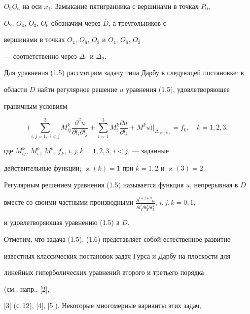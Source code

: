 $O_5O_6$ на оси $x_1$. Замыкание пятигранника с вершинами в точках $P_0$,


$O_2$, $O_4$, $O_3$, $O_6$ обозначим через $\overline D$, а треугольников с


вершинами в точках $O_4$, $O_6$, $O_2$ и $O_4$, $O_6$, $O_3$


--- соответственно через $\Delta_1 $ и $\Delta_2$.





Для уравнения (1.5) рассмотрим задачу типа Дарбу в следующей постановке: в


области $D$ найти регулярное решение $u$ уравнения (1.5), удовлетворяющее


граничным условиям




\begin{equation}


\bigg (\sum_{i,j=1,\;i<j}^3 M_{ij}^k \frac{\partial^{2}u}{\partial l_i


\partial l_j}+\sum_{i=1}^{3}M_i^k \frac{\partial u}{\partial l_i}+M^k u


\bigg ){\Big |}_{\Delta_{\varkappa(k)}}=f_k,\quad k=1,2,3,


\end{equation}


где $M_{ij}^k$, $M_i^k$, $M^k$, $f_k$, $i,j,k=1,2,3$, $i<j$, --- заданные


действительные функции; $\varkappa(k)=1$ при $k=1,2$ и $\varkappa(3)=2$.





Регулярным решением уравнения (1.5) называется функция $u$, непрерывная в $D$


вместе со своими частными производными $\frac{\partial^{i+j+k}u}{\partial


l_1^i \partial l_2^j \partial l_3^k}$, $i,j,k=0,1$,


и удовлетворяющая уравнению (1.5) в $D$.





Отметим, что задача (1.5), (1.6) представляет собой естественное развитие


известных классических постановок задач Гурса и Дарбу на плоскости для


линейных гиперболических уравнений второго и третьего порядка


(см., напр., [2],


[3] (с.\,12), [4], [5]). Некоторые многомерные варианты этих задач,


